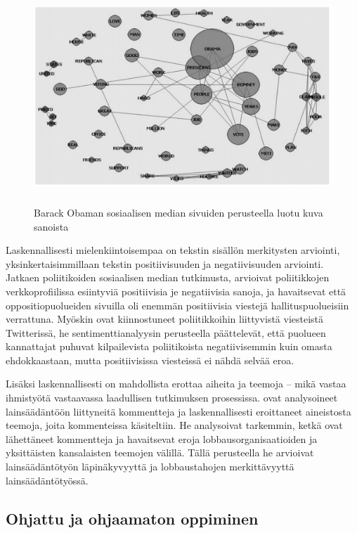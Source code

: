 \documentclass[finnish,gradu,twoside,12pt]{tktltiki}
\begin{document}
{\begin{figure}
\includegraphics[height=8cm]{images/word_net.png} 
\caption{Barack Obaman sosiaalisen median sivuiden perusteella luotu kuva sanoista \citep{groshek2013public}}
\label{fig:wordnet}
\end{figure}

Laskennallisesti mielenkiintoisempaa on tekstin sisällön merkitysten arviointi, yksinkertaisimmillaan tekstin positiivisuuden ja negatiivisuuden arviointi. Jatkaen poliitikoiden sosiaalisen median tutkimusta, \citet{park2011networked} arvioivat poliitikkojen verkkoprofiilissa esiintyviä positiivisia je negatiivisia sanoja, ja havaitsevat että oppositiopuolueiden sivuilla oli enemmän positiivisia viestejä hallituspuolueisiin verrattuna. Myöskin \citet{tumasjan2010election} ovat kiinnostuneet poliitikkoihin liittyvistä viesteistä Twitterissä, he sentimenttianalyysin perusteella päättelevät, että puolueen kannattajat puhuvat kilpailevista poliitikoista negatiivisemmin kuin omasta ehdokkaastaan, mutta positiivisissa viesteissä ei nähdä selvää eroa.

Lisäksi laskennallisesti on mahdollista erottaa aiheita ja teemoja -- mikä vastaa ihmistyötä vastaavassa laadullisen tutkimuksen prosessissa. \citet{levy2013driving} ovat analysoineet lainsäädäntöön liittyneitä kommentteja ja laskennallisesti eroittaneet aineistosta teemoja, joita kommenteissa käsiteltiin. He analysoivat tarkemmin, ketkä ovat lähettäneet kommentteja ja havaitsevat eroja lobbausorganisaatioiden ja yksittäisten kansalaisten teemojen välillä. Tällä perusteella he arvioivat lainsäädäntötyön läpinäkyvyyttä ja lobbaustahojen merkittävyyttä lainsäädäntötyössä.

\subsection*{Ohjattu ja ohjaamaton oppiminen}

}
\end{document}
